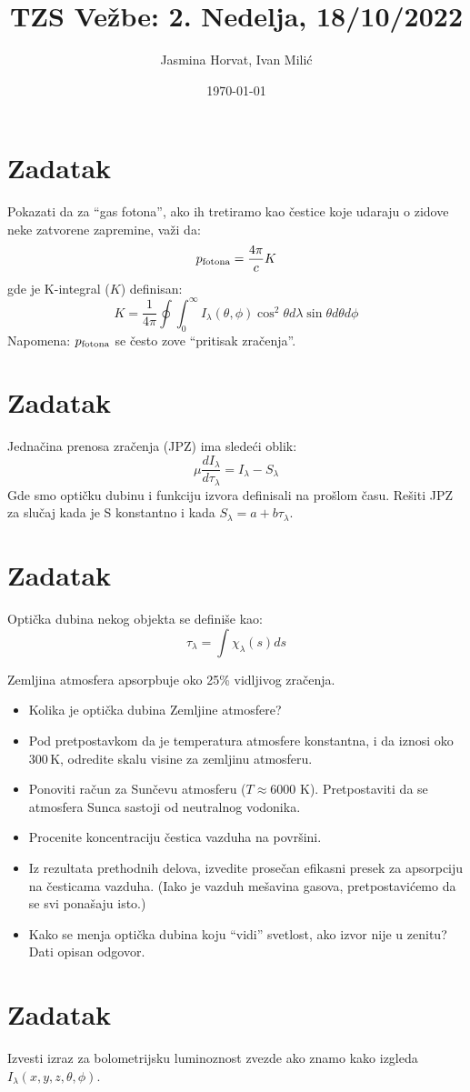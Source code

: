 \documentclass[12pt]{article}
\title{TZS Ve\v{z}be: 2. Nedelja, 18/10/2022}
\author{Jasmina Horvat, Ivan Mili\'{c}}
\date{\today}
\begin{document}
\maketitle

\section{Zadatak}
Pokazati da za ``gas fotona'', ako ih tretiramo kao \v{c}estice koje udaraju o zidove neke zatvorene zapremine, va\v{z}i da: 
\begin{equation}
p_{\rm fotona} = \frac{4\pi}{c} K
\end{equation}
gde je K-integral ($K$) definisan:
\begin{equation}
K = \frac{1}{4\pi}\oint \int_0^{\infty}I_\lambda(\theta,\phi)\cos^2 \theta d\lambda \sin \theta d \theta d \phi
\end{equation}
Napomena: $p_{\rm fotona}$ se \v{c}esto zove ``pritisak zra\v{c}enja''. 

\section{Zadatak}
Jedna\v{c}ina prenosa zra\v{c}enja (JPZ) ima slede\'{c}i oblik:
\begin{equation}
\mu\frac{dI_\lambda}{d\tau_\lambda} = I_\lambda - S_\lambda
\end{equation}
Gde smo opti\v{c}ku dubinu i funkciju izvora definisali na pro\v{s}lom \v{c}asu. Re\v{s}iti JPZ za slu\v{c}aj kada je S konstantno i kada $S_\lambda = a + b \tau_\lambda$. 
\section{Zadatak}
Opti\v{c}ka dubina nekog objekta se defini\v{s}e kao: 
\begin{equation}
\tau_\lambda = \int \chi_\lambda (s) ds
\end{equation}

Zemljina atmosfera apsorpbuje oko 25\% vidljivog zra\v{c}enja. 
\begin{itemize}
    \item Kolika je opti\v{c}ka dubina Zemljine atmosfere?
    \item Pod pretpostavkom da je temperatura atmosfere konstantna, i da iznosi oko 300\,K, odredite skalu visine za zemljinu atmosferu.
    \item Ponoviti ra\v{c}un za Sun\v{c}evu atmosferu ($T \approx 6000$ K). Pretpostaviti da se atmosfera Sunca sastoji od neutralnog vodonika. 
    \item Procenite koncentraciju \v{c}estica vazduha na povr\v{s}ini. 
    \item Iz rezultata prethodnih delova, izvedite prose\v{c}an efikasni presek za apsorpciju na \v{c}esticama vazduha. (Iako je vazduh me\v{s}avina gasova, pretpostavi\'{c}emo da se svi pona\v{s}aju isto.)
    \item Kako se menja opti\v{c}ka dubina koju ``vidi'' svetlost, ako izvor nije u zenitu? Dati opisan odgovor.
\end{itemize}

\section{Zadatak}

Izvesti izraz za bolometrijsku luminoznost zvezde ako znamo kako izgleda $I_\lambda(x,y,z,\theta,\phi)$.
\end{document}
